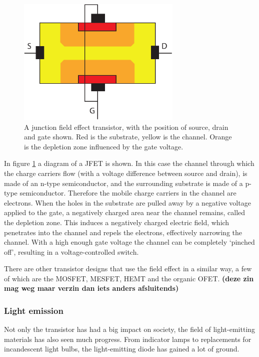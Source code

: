 \begin{figure}[!ht]
 \begin{center}
  \includegraphics[width=0.7\textwidth]{jfet}
  \caption{A junction field effect transistor, with the position of source, drain and gate shown. Red is the substrate, yellow is the channel. Orange is the depletion zone influenced by the gate voltage.}
  \label{fig:JFET}
 \end{center}
\end{figure}

In figure \ref{fig:JFET} a diagram of a JFET is shown. In this case the channel through which the charge carriers flow (with a voltage difference between source and drain), is made of an n-type semiconductor, and the surrounding substrate is made of a p-type semiconductor. Therefore the mobile charge carriers in the channel are electrons. When the holes in the substrate are pulled away by a negative voltage applied to the gate, a negatively charged area near the channel remains, called the depletion zone. This induces a negatively charged electric field, which penetrates into the channel and repels the electrons, effectively narrowing the channel. With a high enough gate voltage the channel can be completely `pinched off', resulting in a voltage-controlled switch.

There are other transistor designs that use the field effect in a similar way, a few of which are the MOSFET, MESFET, HEMT and the organic OFET. \textbf{(deze zin mag weg maar verzin dan iets anders afsluitends)}

\subsubsection{Light emission}
Not only the transistor has had a big impact on society, the field of light-emitting materials has also seen much progress. From indicator lamps to replacements for incandescent light bulbs, the light-emitting diode has gained a lot of ground.

